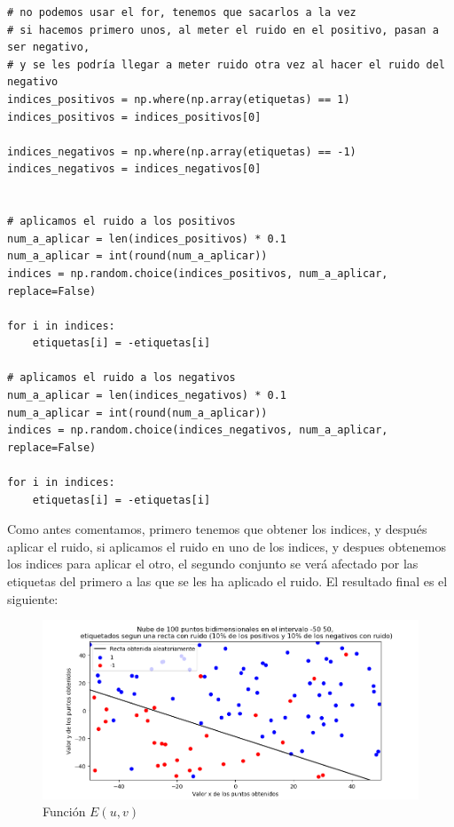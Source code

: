 \documentclass[12pt, spanish]{article}
\begin{document}
\begin{lstlisting}
# no podemos usar el for, tenemos que sacarlos a la vez
# si hacemos primero unos, al meter el ruido en el positivo, pasan a ser negativo,
# y se les podría llegar a meter ruido otra vez al hacer el ruido del negativo
indices_positivos = np.where(np.array(etiquetas) == 1)
indices_positivos = indices_positivos[0]

indices_negativos = np.where(np.array(etiquetas) == -1)
indices_negativos = indices_negativos[0]


# aplicamos el ruido a los positivos
num_a_aplicar = len(indices_positivos) * 0.1
num_a_aplicar = int(round(num_a_aplicar))
indices = np.random.choice(indices_positivos, num_a_aplicar, replace=False)

for i in indices:
	etiquetas[i] = -etiquetas[i]

# aplicamos el ruido a los negativos
num_a_aplicar = len(indices_negativos) * 0.1
num_a_aplicar = int(round(num_a_aplicar))
indices = np.random.choice(indices_negativos, num_a_aplicar, replace=False)

for i in indices:
	etiquetas[i] = -etiquetas[i]

\end{lstlisting}

Como antes comentamos, primero tenemos que obtener los indices, y después aplicar el ruido, si aplicamos el ruido en uno de los indices, y despues obtenemos los indices para aplicar el otro, el segundo conjunto se verá afectado por las etiquetas del primero a las que se les ha aplicado el ruido. El resultado final es el siguiente:


\begin{figure}[H]
  \centering
      \includegraphics[scale = 0.70]{ej-1-2-2-ruido.png}
 		 \caption{Función $E(u,v)$}
  		\label{fig:ej1-2}

\end{figure}
\end{document}
